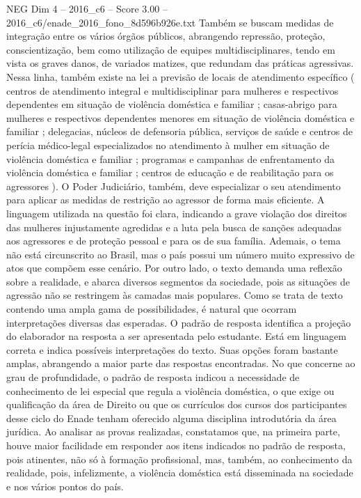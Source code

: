 \begin{textsample}{NEG Dim 4 – 2016\_c6 – Score 3.00 – 2016\_c6/enade\_2016\_fono\_8d596b926e.txt}
Também se buscam medidas de integração entre os vários órgãos públicos, abrangendo repressão, proteção, conscientização, bem como utilização de equipes multidisciplinares, tendo em vista os graves danos, de variados matizes, que redundam das práticas agressivas.
Nessa linha, também existe na lei a previsão de locais de atendimento específico ( centros de atendimento integral e multidisciplinar para mulheres e respectivos dependentes em situação de violência doméstica e familiar ; casas-abrigo para mulheres e respectivos dependentes menores em situação de violência doméstica e familiar ; delegacias, núcleos de defensoria pública, serviços de saúde e centros de perícia médico-legal especializados no atendimento à mulher em situação de violência doméstica e familiar ; programas e campanhas de enfrentamento da violência doméstica e familiar ; centros de educação e de reabilitação para os agressores ).
O Poder Judiciário, também, deve especializar o seu atendimento para aplicar as medidas de restrição ao agressor de forma mais eficiente.
A linguagem utilizada na questão foi clara, indicando a grave violação dos direitos das mulheres injustamente agredidas e a luta pela busca de sanções adequadas aos agressores e de proteção pessoal e para os de sua família.
Ademais, o tema não está circunscrito ao Brasil, mas o país possui um número muito expressivo de atos que compõem esse cenário.
Por outro lado, o texto demanda uma reflexão sobre a realidade, e abarca diversos segmentos da sociedade, pois as situações de agressão não se restringem às camadas mais populares.
Como se trata de texto contendo uma ampla gama de possibilidades, é natural que ocorram interpretações diversas das esperadas.
O padrão de resposta identifica a projeção do elaborador na resposta a ser apresentada pelo estudante.
Está em linguagem correta e indica possíveis interpretações do texto.
Suas opções foram bastante amplas, abrangendo a maior parte das respostas encontradas.
No que concerne ao grau de profundidade, o padrão de resposta indicou a necessidade de conhecimento de lei especial que regula a violência doméstica, o que exige ou qualificação da área de Direito ou que os currículos dos cursos dos participantes desse ciclo do Enade tenham oferecido alguma disciplina introdutória da área jurídica.
Ao analisar as provas realizadas, constatamos que, na primeira parte, houve maior facilidade em responder aos itens indicados no padrão de resposta, pois atinentes, não só à formação profissional, mas, também, ao conhecimento da realidade, pois, infelizmente, a violência doméstica está disseminada na sociedade e nos vários pontos do país.

\end{textsample}
